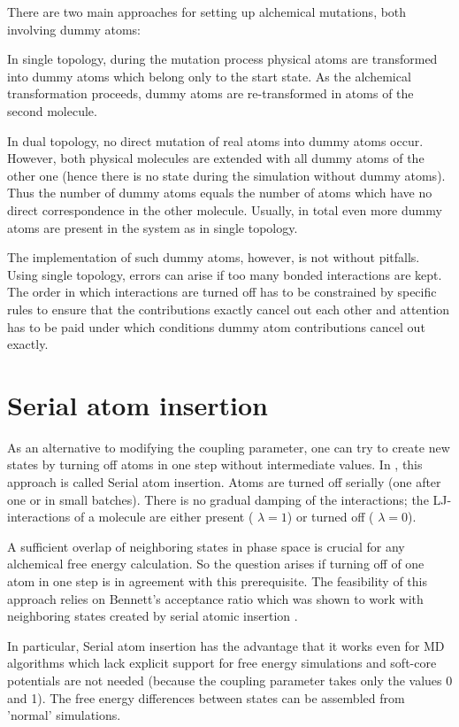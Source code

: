 There are two main approaches for setting up alchemical mutations, both involving dummy atoms: 

In single topology, during the mutation process physical atoms are
transformed into dummy atoms which belong only to the start state.
As the alchemical transformation proceeds, dummy atoms are re-transformed
in atoms of the second molecule.

In dual topology, no direct mutation of real atoms into dummy atoms
occur. However, both physical molecules are extended with all dummy
atoms of the other one (hence there is no state during the simulation
without dummy atoms). Thus the number of dummy atoms equals the number
of atoms which have no direct correspondence in the other molecule.
Usually, in total even more dummy atoms are present in the system
as in single topology. \cite{Fleck.2021}

The implementation of such dummy atoms, however, is not without pitfalls.
Using single topology, errors can arise if too many bonded interactions are kept. The order in which interactions are turned off has to be constrained
by specific rules to ensure that the contributions exactly cancel
out each other and attention has to be paid under which conditions
dummy atom contributions cancel out exactly. \cite{Fleck.2021}

\section{Serial atom insertion}

As an alternative to modifying the coupling parameter, one can
try to create new states by turning off atoms in one step without
intermediate values. In \cite{Boresch.2011}, this approach is called
Serial atom insertion. Atoms are turned off serially (one after one
or in small batches). There is no gradual damping of the interactions; the
LJ-interactions of a molecule are either present ( $\lambda=1$) or
turned off ( $\lambda=0$).

A sufficient overlap of neighboring states in phase space is crucial
for any alchemical free energy calculation. So the question arises
if turning off of one atom in one step is in agreement with this prerequisite. The feasibility of this approach relies on Bennett's acceptance
ratio which was shown to work with neighboring states created
by serial atomic insertion \cite{Boresch.2011}.

In particular, Serial atom insertion has the advantage that it works
even for MD algorithms which lack explicit support for free energy
simulations and soft-core potentials are not needed (because the coupling
parameter takes only the values 0 and 1). The free energy differences
between states can be assembled from 'normal' simulations.

